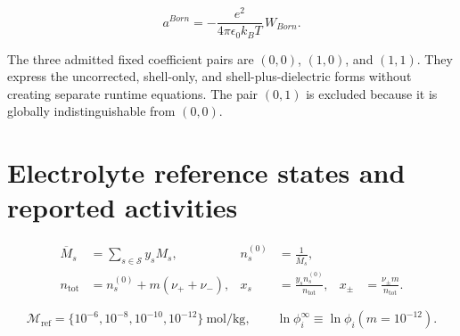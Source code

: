\documentclass[11pt]{article}
\begin{document}
\begin{equation}
a^{Born}=-\frac{e^2}{4\pi\epsilon_0k_BT}\,W_{Born}.
\label{eq:born_residual_helmholtz}
\end{equation}

The three admitted fixed coefficient pairs are $(0,0)$, $(1,0)$, and $(1,1)$.
They express the uncorrected, shell-only, and shell-plus-dielectric forms without
creating separate runtime equations.  The pair $(0,1)$ is excluded because it
is globally indistinguishable from $(0,0)$.

\section{Electrolyte reference states and reported activities}

\begin{equation}
\begin{aligned}
\overline M_s&=\sum_{s\in\mathcal{S}}y_sM_s,
&n_s^{(0)}&=\frac{1}{\overline M_s},\\
n_{\mathrm{tot}}&=n_s^{(0)}+m(\nu_++\nu_-),
&x_s&=\frac{y_sn_s^{(0)}}{n_{\mathrm{tot}}},
&x_\pm&=\frac{\nu_\pm m}{n_{\mathrm{tot}}}.
\end{aligned}
\label{eq:formula_unit_composition}
\end{equation}

\begin{equation}
\mathcal{M}_{\mathrm{ref}}=
\{10^{-6},10^{-8},10^{-10},10^{-12}\}
\ \si{\mole\per\kilogram},
\qquad
\ln\phi_i^\infty\equiv\ln\phi_i(m=10^{-12}).
\label{eq:reference_molality_sequence}
\end{equation}
\end{document}

